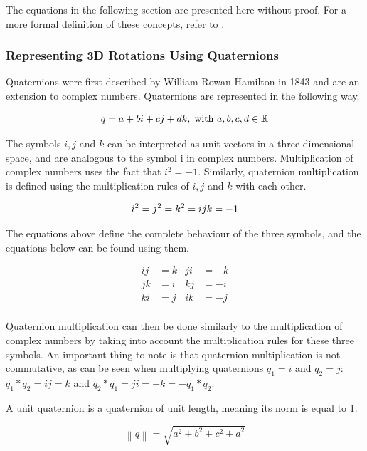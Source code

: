 The equations in the following section are presented here without proof. For a more formal definition of these concepts, refer to \cite{quaternions}.

\subsubsection{Representing 3D Rotations Using Quaternions}

Quaternions were first described by William Rowan Hamilton in 1843 and are an extension to complex numbers. Quaternions are represented in the following way.

\begin{equation}
    q = a + bi + cj + dk, \; \text{with } a, b, c, d \in \mathbb{R} \\
\end{equation}

The symbols \( i, j \) and \( k \) can be interpreted as unit vectors in a three-dimensional space, and are analogous to the symbol i in complex numbers. Multiplication of complex numbers uses the fact that \( i^2 = -1 \). Similarly, quaternion multiplication is defined using the multiplication rules of \( i, j \) and \( k \) with each other.

\begin{equation}
    i^2 = j^2 = k^2 = ijk = -1 \\
\end{equation}

The equations above define the complete behaviour of the three symbols, and the equations below can be found using them.

\begin{align*}
    ij &= k & ji &= -k \\
    jk &= i & kj &= -i \\
    ki &= j & ik &= -j \\
\end{align*}

Quaternion multiplication can then be done similarly to the multiplication of complex numbers by taking into account the multiplication rules for these three symbols. An important thing to note is that quaternion multiplication is not commutative, as can be seen when multiplying quaternions \( q_1 = i \) and \( q_2 = j \): \( q_1*q_2 = ij = k \) and \( q_2*q_1 = ji = -k = -q_1*q_2 \). 

A unit quaternion is a quaternion of unit length, meaning its norm is equal to 1. 

\begin{equation}
    \left \| q \right \| = \sqrt{a^2 + b^2 + c^2 + d^2}
\end{equation}

